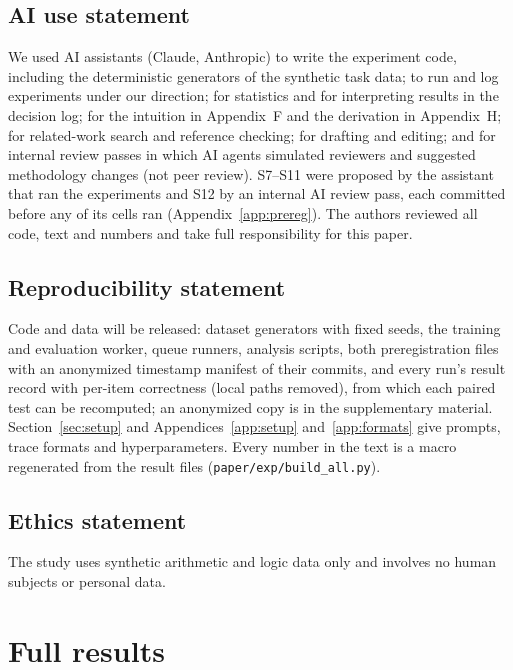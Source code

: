 \documentclass{article}
\theoremstyle{definition}
\begin{document}
\subsection*{AI use statement}
We used AI assistants (Claude, Anthropic) to write the experiment code, including the deterministic generators of the synthetic task data; to run and log experiments under our direction; for statistics and for interpreting results in the decision log; for the intuition in Appendix~F and the derivation in Appendix~H; for related-work search and reference checking; for drafting and editing; and for internal review passes in which AI agents simulated reviewers and suggested methodology changes (not peer review). S7--S11 were proposed by the assistant that ran the experiments and S12 by an internal AI review pass, each committed before any of its cells ran (Appendix~\ref{app:prereg}). The authors reviewed all code, text and numbers and take full responsibility for this paper.

\subsection*{Reproducibility statement}
Code and data will be released: dataset generators with fixed seeds, the training and evaluation worker, queue runners, analysis scripts, both preregistration files with an anonymized timestamp manifest of their commits, and every run's result record with per-item correctness (local paths removed), from which each paired test can be recomputed; an anonymized copy is in the supplementary material. Section~\ref{sec:setup} and Appendices~\ref{app:setup} and~\ref{app:formats} give prompts, trace formats and hyperparameters. Every number in the text is a macro regenerated from the result files (\texttt{paper/exp/build\_all.py}).

\subsection*{Ethics statement}
The study uses synthetic arithmetic and logic data only and involves no human subjects or personal data.




\appendix
\section{Full results}
\label{app:tables}
\end{document}

